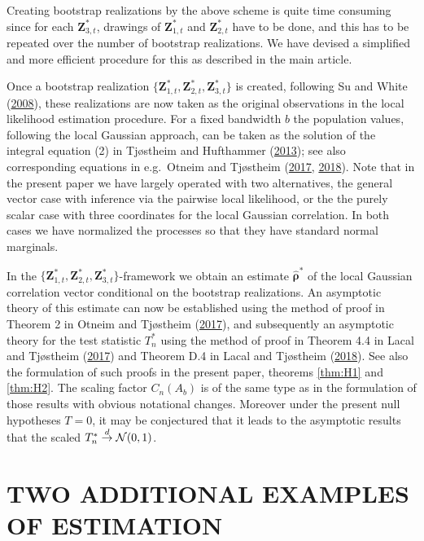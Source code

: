 \documentclass[
  12pt,
  letterpaper]{article}
\numberwithin{equation}{section}
\newcommand{\Z}{\bm{Z}}
\newcommand{\hfrho}{\widehat{\bm{\rho}}}
\begin{document}
Creating bootstrap realizations by the above scheme is quite time consuming since
for each \(\Z_{3,t}^*\), drawings of \(\Z_{1,t}^*\) and \(\Z_{2,t}^*\) have to be done, and this has to be repeated over the number of bootstrap realizations. We have devised a simplified and more efficient procedure for this as described in the main article.

Once a bootstrap realization \(\{\Z_{1,t}^*,\Z_{2,t}^*,\Z_{3,t}^*\}\) is created, following Su and White (\protect\hyperlink{ref-su2008nonparametric}{2008}), these realizations are now taken as the original observations in the local likelihood estimation procedure. For a fixed bandwidth \(b\) the population values, following the local Gaussian approach, can be taken as the solution of the integral equation (2) in Tjøstheim and Hufthammer (\protect\hyperlink{ref-tjostheim2013local}{2013}); see also corresponding equations in e.g.~Otneim and Tjøstheim (\protect\hyperlink{ref-otneim2017locally}{2017}, \protect\hyperlink{ref-otneim2017conditional}{2018}). Note that in the present paper we have largely operated with two alternatives, the general vector case with inference via the pairwise local likelihood, or the the purely scalar case with three coordinates for the local Gaussian correlation. In both cases we have normalized the processes so that they have standard normal marginals.

In the \(\{\Z_{1,t}^*,\Z_{2,t}^*,\Z_{3,t}^*\}\)-framework we obtain an estimate \(\hfrho^*\) of the local Gaussian correlation vector conditional on the bootstrap realizations. An asymptotic theory of this estimate can now be established using the method of proof in Theorem 2 in Otneim and Tjøstheim (\protect\hyperlink{ref-otneim2017locally}{2017}), and subsequently an asymptotic theory for the test statistic \(T_n^*\) using the method of proof in Theorem 4.4 in Lacal and Tjøstheim (\protect\hyperlink{ref-lacal2017local}{2017}) and Theorem D.4 in Lacal and Tjøstheim (\protect\hyperlink{ref-lacal2018estimating}{2018}). See also the formulation of such proofs in the present paper, theorems \ref{thm:H1} and \ref{thm:H2}. The scaling factor \(C_n(A_b)\) is of the same type as in the formulation of those results with obvious notational changes. Moreover under the present null hypotheses \(T = 0\), it may be conjectured that it leads to the asymptotic results that the scaled \(T_n^* \buildrel {d} \over {\to} {\cal N}(0,1)\).

\hypertarget{two-additional-examples-of-estimation}{%
\section{TWO ADDITIONAL EXAMPLES OF ESTIMATION}\label{two-additional-examples-of-estimation}}
\end{document}
